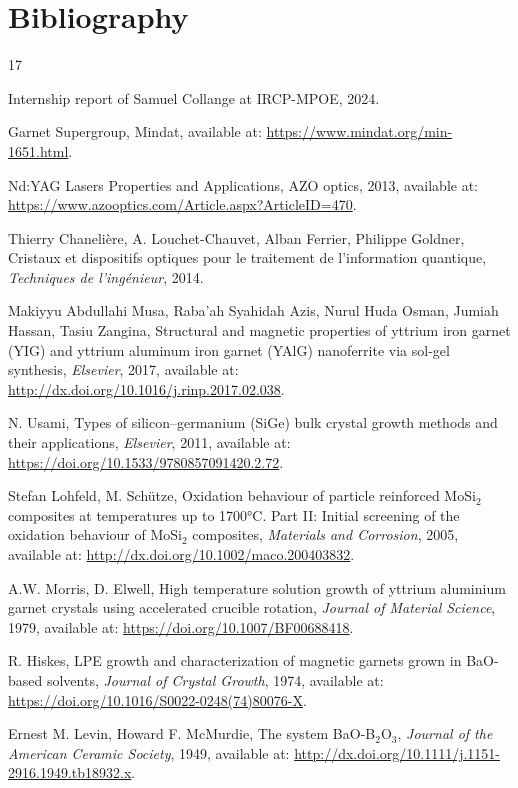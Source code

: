 \documentclass{rapportENSCP}
\begin{document}
\section{Bibliography}
\begin{thebibliography}{17}

 Internship report of Samuel Collange at IRCP-MPOE, 2024. 

 Garnet Supergroup, Mindat, available at: \url{https://www.mindat.org/min-1651.html}.

 Nd:YAG Lasers Properties and Applications, AZO optics, 2013, available at: \url{https://www.azooptics.com/Article.aspx?ArticleID=470}.

 Thierry Chanelière, A. Louchet-Chauvet, Alban Ferrier, Philippe Goldner, Cristaux et dispositifs optiques pour le traitement de l’information quantique, \textit{Techniques de l’ingénieur}, 2014.

 Makiyyu Abdullahi Musa, Raba’ah Syahidah Azis, Nurul Huda Osman, Jumiah Hassan, Tasiu Zangina, Structural and magnetic properties of yttrium iron garnet (YIG) and yttrium aluminum iron garnet (YAlG) nanoferrite via sol-gel synthesis, \textit{Elsevier}, 2017, available at: \url{http://dx.doi.org/10.1016/j.rinp.2017.02.038}.

 N. Usami, Types of silicon–germanium (SiGe) bulk crystal growth methods and their applications, \textit{Elsevier}, 2011, available at: \url{https://doi.org/10.1533/9780857091420.2.72}.

 Stefan Lohfeld, M. Schütze, Oxidation behaviour of particle reinforced MoSi$_2$ composites at temperatures up to 1700°C. Part II: Initial screening of the oxidation behaviour of MoSi$_2$ composites, \textit{Materials and Corrosion}, 2005, available at: \url{http://dx.doi.org/10.1002/maco.200403832}.

 A.W. Morris, D. Elwell, High temperature solution growth of yttrium aluminium garnet crystals using accelerated crucible rotation, \textit{Journal of Material Science}, 1979, available at: \url{https://doi.org/10.1007/BF00688418}.

 R. Hiskes, LPE growth and characterization of magnetic garnets grown in BaO-based solvents, \textit{Journal of Crystal Growth}, 1974, available at: \url{https://doi.org/10.1016/S0022-0248(74)80076-X}.

 Ernest M. Levin, Howard F. McMurdie, The system BaO-B$_2$O$_3$, \textit{Journal of the American Ceramic Society}, 1949, available at: \url{http://dx.doi.org/10.1111/j.1151-2916.1949.tb18932.x}.


\end{thebibliography}
\end{document}
